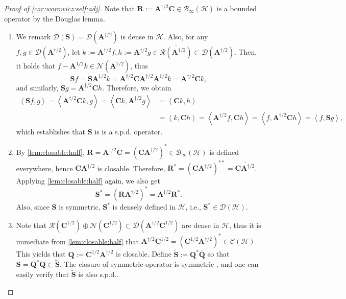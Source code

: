 \documentclass[noinfoline]{imsart}\setcounter{tocdepth}{2}
\newcommand{\m}[1]{\mathbf{#1}} %
\renewcommand{\c}[1]{\mathcal{#1}} %
\newcommand{\innpr}[2]{{\left\langle {#1},{#2}\right\rangle}} %
\theoremstyle{plain}
\begin{document}
\begin{proof}[Proof of \cref{cor:worowicz:self:adj}]
Note that $\m{R} := \m{A}^{\dagger/2} \m{C} \in \c{B}_{\infty}(\c{H})$ is a bounded operator by the Douglas lemma.

\begin{enumerate}[leftmargin = *]
\item We remark $\c{D}(\m{S}) = \c{D}(\m{A}^{\dagger/2})$ is dense in $\c{H}$. 
Also, for any $f, g \in \c{D}(\m{A}^{\dagger/2})$, let $k := \m{A}^{\dagger/2} f, h := \m{A}^{\dagger/2} g \in \overline{\c{R}(\m{A}^{1/2})} \subset \c{D}(\m{A}^{\dagger/2})$. Then, it holds that $f - \m{A}^{1/2} k \in \c{N}(\m{A}^{1/2})$, thus
\begin{equation*}
    \m{S} f = \m{S} \m{A}^{1/2} k = \m{A}^{\dagger/2} \m{C} \m{A}^{\dagger/2} \m{A}^{1/2} k = \m{A}^{\dagger/2} \m{C} k,
\end{equation*}
and similarly, $\m{S} g = \m{A}^{\dagger/2} \m{C} h$. Therefore, we obtain
\begin{align*}
    \innpr{\m{S}f}{g} = \innpr{\m{A}^{\dagger/2} \m{C} k}{g} = \innpr{\m{C} k}{\m{A}^{\dagger/2} g} &= \innpr{\m{C} k}{h} \\
    &= \innpr{k}{\m{C} h} = \innpr{\m{A}^{\dagger/2} f}{\m{C} h} = \innpr{f}{\m{A}^{\dagger/2} \m{C} h} = \innpr{f}{\m{S} g},
\end{align*}
which establishes that $\m{S}$ is is a s.p.d. operator.

\item By \cref{lem:closable:half}, $\m{R} = \m{A}^{\dagger/2} \m{C} = (\m{C} \m{A}^{\dagger/2})^{*} \in \c{B}_{\infty}(\c{H})$ is defined everywhere, hence $\m{C} \m{A}^{\dagger/2}$ is closable. Therefore, $\m{R}^{*} = (\m{C} \m{A}^{\dagger/2})^{**} = \overline{\m{C} \m{A}^{\dagger/2}}$. Applying \cref{lem:closable:half} again, we also get
\begin{equation*}
    \m{S}^{*} = (\m{R} \m{A}^{\dagger/2})^{*} = \m{A}^{\dagger/2} \m{R}^{*}.
\end{equation*}
Also, since $\m{S}$ is symmetric, $\m{S}^{*}$ is densely defined in $\c{H}$, i.e., $\m{S}^{*} \in \c{D}(\c{H})$.

\item Note that $\c{R}(\m{C}^{1/2}) \oplus \c{N}(\m{C}^{1/2}) \subset \c{D}(\m{A}^{\dagger/2} \m{C}^{1/2})$ are dense in $\c{H}$, thus it is immediate from \cref{lem:closable:half} that $\m{A}^{\dagger/2} \m{C}^{1/2} = (\m{C}^{1/2} \m{A}^{\dagger/2})^{*} \in \c{C}(\c{H})$. This yields that $\m{Q}:= \m{C}^{1/2} \m{A}^{\dagger/2}$ is closable. Define $\tilde{\m{S}} := \m{Q}^{*} \overline{\m{Q}}$ so that $\m{S} = \m{Q}^{*} \m{Q} \subset \tilde{\m{S}}$. The closure of symmetric operator is symmetric \cite{conway2019course}, and one can easily verify that $\tilde{\m{S}}$ is also s.p.d.. 


\end{enumerate}
\end{proof}
\end{document}

